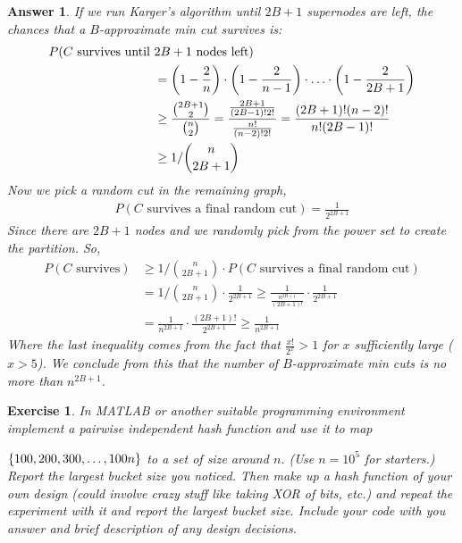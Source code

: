 \documentclass[12pt]{article}
\theoremstyle{colon}
\newtheorem{exercise}{Exercise}
\newtheorem*{answer}{Answer}
\begin{document}
\begin{answer}
  If we run Karger's algorithm until $2B+1$ supernodes are left, the chances that a $B$-approximate min cut survives is:
  \begin{align*}
    P(C \text{ survives until } &2B+1 \text{ nodes left}) \\
    &= \left( 1-\frac{2}{n} \right) \cdot \left( 1-\frac{2}{n-1} \right) \cdot \mathellipsis \cdot \left( 1-\frac{2}{2B+1} \right) \\
    &\geq \frac{\binom{2B+1}{2}}{\binom{n}{2}} = \frac{\frac{2B+1}{(2B-1)!2!}}{\frac{n!}{(n-2)!2!}} = \frac{(2B+1)!(n-2)!}{n!(2B-1)!} \\
    &\geq 1/\binom{n}{2B+1}
  \end{align*}
  Now we pick a random cut in the remaining graph,
  \begin{gather*}
    P(C \text{ survives a final random cut}) = \frac{1}{2^{2B+1}}
  \end{gather*}
  Since there are $2B+1$ nodes and we randomly pick from the power set to create the partition. So,
  \begin{align*}
    P(C \text{ survives}) &\geq 1/\binom{n}{2B+1} \cdot P(C \text{ survives a final random cut}) \\
    &= 1/\binom{n}{2B+1} \cdot \frac{1}{2^{2B+1}} \geq \frac{1}{\frac{n^{2B+1}}{(2B+1)!}} \cdot \frac{1}{2^{2B+1}} \\
    &= \frac{1}{n^{2B+1}} \cdot \frac{(2B+1)!}{2^{2B+1}} \geq \frac{1}{n^{2B+1}}
  \end{align*}
  Where the last inequality comes from the fact that $\frac{x!}{2^x} > 1$ for $x$ sufficiently large ($x > 5$).
  We conclude from this that the number of $B$-approximate min cuts is no more than $n^{2B+1}$.
\end{answer}

\clearpage

\begin{exercise}
  In MATLAB or another suitable programming environment implement a pairwise independent hash function and use it to map

  $\{ 100, 200, 300,\mathellipsis, 100n \}$ to a set of size around $n$. (Use $n = 10^5$ for starters.) Report the largest bucket size you noticed. Then make up a hash function of your own design (could involve crazy stuff like taking XOR of bits, etc.) and repeat the experiment with it and report the largest bucket size. Include your code with you answer and brief description of any design decisions.
\end{exercise}
\end{document}
